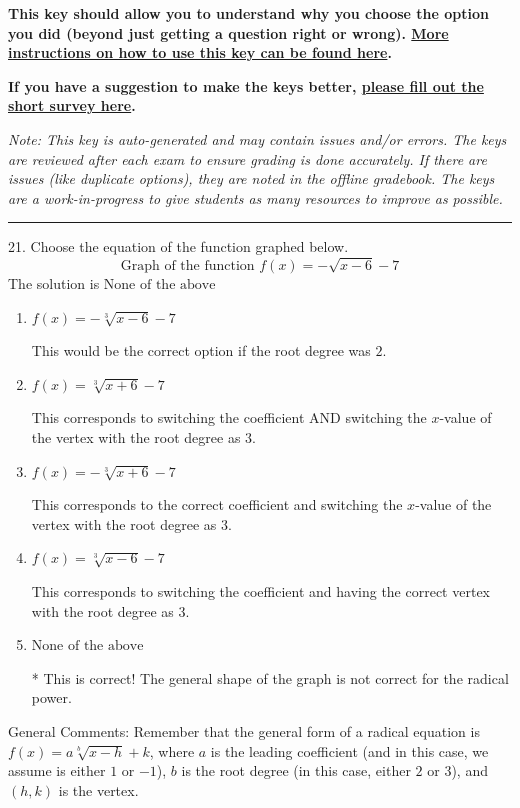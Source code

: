 \documentclass{extbook}[14pt]
\begin{document}
\textbf{This key should allow you to understand why you choose the option you did (beyond just getting a question right or wrong). \href{https://xronos.clas.ufl.edu/mac1105spring2020/courseDescriptionAndMisc/Exams/LearningFromResults}{More instructions on how to use this key can be found here}.}

\textbf{If you have a suggestion to make the keys better, \href{https://forms.gle/CZkbZmPbC9XALEE88}{please fill out the short survey here}.}

\textit{Note: This key is auto-generated and may contain issues and/or errors. The keys are reviewed after each exam to ensure grading is done accurately. If there are issues (like duplicate options), they are noted in the offline gradebook. The keys are a work-in-progress to give students as many resources to improve as possible.}

\rule{\textwidth}{0.4pt}

21. Choose the equation of the function graphed below.
\[ \text{Graph of the function } f(x) = - \sqrt{x - 6} - 7 \] 
The solution is $ \text{None of the above} $ 

\begin{enumerate}[label=\Alph*.] 
\item $ f(x) = - \sqrt[3]{x - 6} - 7 $ 

 This would be the correct option if the root degree was $2$. 
\item $ f(x) = \sqrt[3]{x + 6} - 7 $ 

 This corresponds to switching the coefficient AND switching the $x$-value of the vertex with the root degree as $3$. 
\item $ f(x) = - \sqrt[3]{x + 6} - 7 $ 

 This corresponds to the correct coefficient and switching the $x$-value of the vertex with the root degree as $3$. 
\item $ f(x) = \sqrt[3]{x - 6} - 7 $ 

 This corresponds to switching the coefficient and having the correct vertex with the root degree as $3$. 
\item $ \text{None of the above} $ 

 * This is correct! The general shape of the graph is not correct for the radical power. 
\end{enumerate} 
 
General Comments: Remember that the general form of a radical equation is $ f(x) = a \sqrt[b]{x - h} + k$, where $a$ is the leading coefficient (and in this case, we assume is either $1$ or $-1$), $b$ is the root degree (in this case, either $2$ or $3$), and $(h, k)$ is the vertex.
\end{document}
